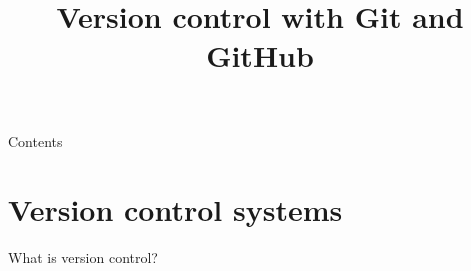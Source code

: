 

\title{Version control with Git and GitHub}



\maketitle

\begin{frame}{Contents}
    \tableofcontents[hideallsubsections]
\end{frame}

\section{Version control systems}

\begin{frame}{What is version control?}
\end{frame}
